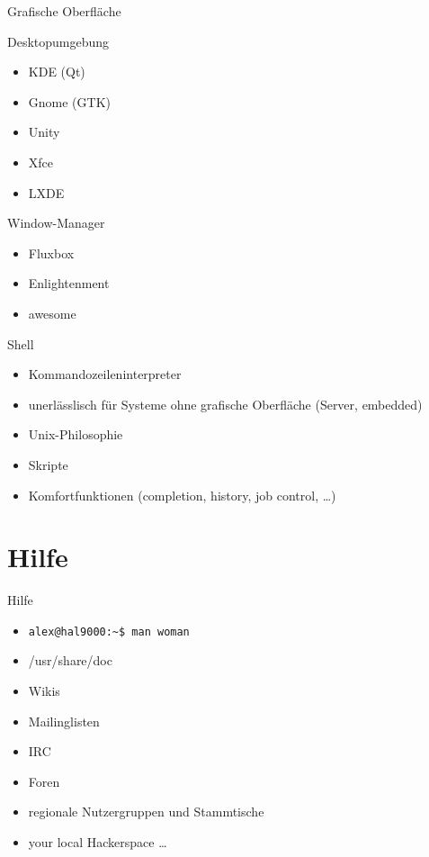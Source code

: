 \documentclass{beamer}
\begin{document}
\begin{frame}{Grafische Oberfläche}
    \begin{block}{Desktopumgebung}
        \begin{itemize}
            \item KDE (Qt)
            \item Gnome (GTK)
            \item Unity
            \item Xfce  
            \item LXDE
        \end{itemize}
    \end{block}
    \pause
    \begin{block}{Window-Manager}
        \begin{itemize}
            \item Fluxbox
            \item Enlightenment
            \item awesome
        \end{itemize}
    \end{block}
\end{frame}

\begin{frame}{Shell}
    \begin{itemize}
        \item Kommandozeileninterpreter
        \item unerlässlisch für Systeme ohne grafische Oberfläche 
            (Server, embedded)
        \item Unix-Philosophie
        \item Skripte
        \item Komfortfunktionen (completion, history, job control, …)
    \end{itemize}
\end{frame}

\section{Hilfe}
\begin{frame}{Hilfe}
    \begin{itemize}
        \item \texttt{alex@hal9000:\textasciitilde\$ man woman}
        \item /usr/share/doc
        \item Wikis
        \item Mailinglisten
        \item IRC
        \item Foren
        \item regionale Nutzergruppen und Stammtische
        \item your local Hackerspace …
    \end{itemize}
\end{frame}
\end{document}
